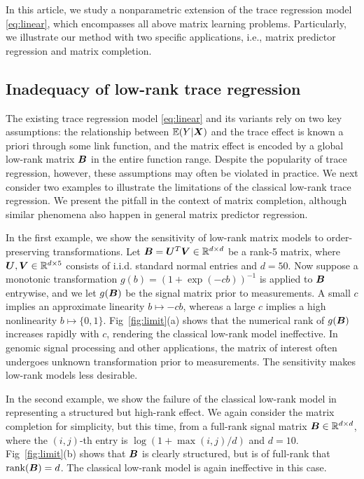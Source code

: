 \documentclass[aos]{imsart}
\theoremstyle{definition}
\begin{document}
\noindent
In this article, we study a nonparametric extension of the trace regression model \eqref{eq:linear}, which encompasses all above matrix learning problems. Particularly, we illustrate our method with two specific applications, i.e., matrix predictor regression and matrix completion.



\subsection{Inadequacy of low-rank trace regression}
\label{sec:limit}

The existing trace regression model \eqref{eq:linear} and its variants rely on two key assumptions: the relationship between $\mathbb{E}(Y|\bm X)$ and the trace effect is known a priori through some link function, and the matrix effect is encoded by a global low-rank matrix $\bm B$ in the entire function range. Despite the popularity of trace regression, however, these assumptions may often be violated in practice. We next consider two examples to illustrate the limitations of the classical low-rank trace regression. We present the pitfall in the context of matrix completion, although similar phenomena also happen in general matrix predictor regression. 

In the first example, we show the sensitivity of low-rank matrix models to order-preserving transformations. Let $\bm B=\bm{U}^T\bm{V} \in \mathbb{R}^{d\times d}$ be a rank-5 matrix, where $\bm{U}, \bm{V} \in\mathbb{R}^{d\times 5}$ consists of i.i.d. standard normal entries and $d=50$. Now suppose a monotonic transformation $g(b)=(1+\exp(-cb))^{-1}$ is applied to $\bm B$ entrywise, and we let $g(\bm B)$ be the signal matrix prior to measurements. A small $c$ implies an approximate linearity $b\mapsto -cb$, whereas a large $c$ implies a high nonlinearity $b\mapsto \{0,1\}$. Fig~\ref{fig:limit}(a) shows that the numerical rank of $g(\bm B)$ increases rapidly with $c$, rendering the classical low-rank model ineffective. In genomic signal processing and other applications, the matrix of interest often undergoes unknown transformation prior to measurements. The sensitivity makes low-rank models less desirable. 

In the second example, we show the failure of the classical low-rank model in representing a structured but high-rank effect. We again consider the matrix completion for simplicity, but this time, from a full-rank signal matrix $\bm B\in\mathbb{R}^{d\times d}$, where the $(i,j)$-th entry is $\log(1+\max(i,j)/d)$ and $d=10$. Fig~\ref{fig:limit}(b) shows that $\bm B$ is clearly structured, but is of full-rank that $\text{rank}(\bm B)=d$. The classical low-rank model is again ineffective in this case. 
\end{document}
